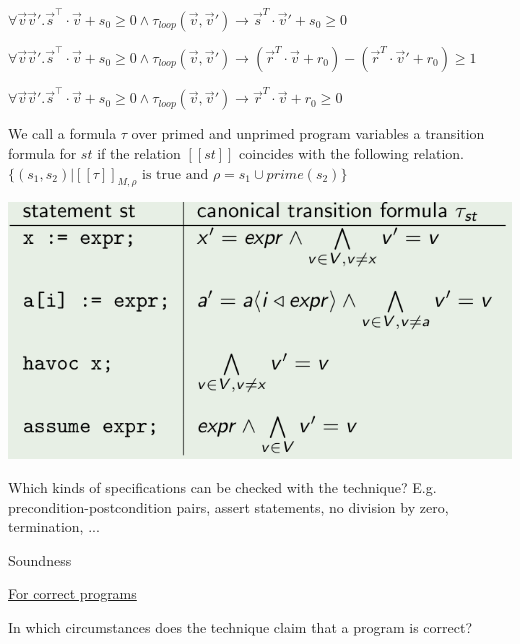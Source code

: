 \documentclass[a4paper]{article}
\begin{document}
\begin{minipage}[t]{0.16\linewidth}
\begin{betterlist}
{{\begin{betterlist}
\begin{betterlist}
\begin{betterlist}
							\item $\forall\vec{v}\vec{v}'.\vec{s}^⊺\cdot \vec{v} + s_0 \geq 0 \land \tau_{loop}(\vec{v},\vec{v}') \rightarrow\vec{s}^T\cdot \vec{v}' + s_0 \geq 0$
							\item $\forall\vec{v}\vec{v}'.\vec{s}^⊺\cdot \vec{v} + s_0 \geq 0 \land \tau_{loop}(\vec{v},\vec{v}') \rightarrow (\vec{r}^T\cdot \vec{v} + r_0) −(\vec{r}^T\cdot \vec{v}'  + r_0) \geq 1$
							\item $\forall\vec{v}\vec{v}'.\vec{s}^⊺\cdot \vec{v} + s_0 \geq 0 \land \tau_{loop}(\vec{v},\vec{v}') \rightarrow\vec{r}^T\cdot \vec{v} + r_0 \geq 0$
						\end{betterlist}
					\end{betterlist}
					\item We call a formula $\tau$ over primed and unprimed program variables a \alert{transition formula} for $st$ if the relation $[[st]]$ coincides with the following relation. $\{(s_1, s_2) | [[\tau]]_{M,\rho} \text{ is true and } \rho = s_1 \cup prime(s_2)\}$

					\includegraphics[width=0.5\linewidth]{./figures/transition_formulas.png}
				\end{betterlist}
			}}
		\item Which kinds of specifications can be checked with the technique? E.g. precondition-postcondition pairs, assert statements, no division by zero, termination, ...

		\item \alert{Soundness}
		\begin{betterlist}
			\item \underline{For correct programs}
			\begin{betterlist}
				\item In which circumstances does the technique claim that a program is correct?


\end{betterlist}
\end{betterlist}
\end{betterlist}
\end{minipage}
\end{document}
